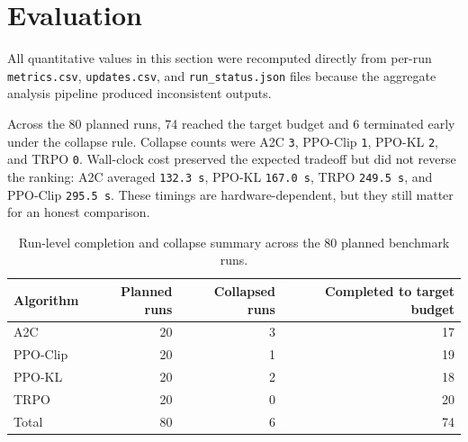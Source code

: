 \documentclass{article}
\begin{document}
\section{Evaluation}

All quantitative values in this section were recomputed directly from per-run \texttt{metrics.csv}, \texttt{updates.csv}, and \texttt{run\_status.json} files because the aggregate analysis pipeline produced inconsistent outputs.

\begin{table}[t]
  \caption{Mean final evaluation return by environment (mean $\pm$ sd across 5 seeds), with collapsed runs in parentheses. Final return means the last logged evaluation checkpoint for each run, and collapsed runs remain included at their last logged evaluation return.}
  \label{tab:main-results}
  \centering
  \scriptsize
\end{table}

Across the 80 planned runs, 74 reached the target budget and 6 terminated early under the collapse rule. Collapse counts were A2C \texttt{3}, PPO-Clip \texttt{1}, PPO-KL \texttt{2}, and TRPO \texttt{0}. Wall-clock cost preserved the expected tradeoff but did not reverse the ranking: A2C averaged \texttt{132.3 s}, PPO-KL \texttt{167.0 s}, TRPO \texttt{249.5 s}, and PPO-Clip \texttt{295.5 s}. These timings are hardware-dependent, but they still matter for an honest comparison.

\begin{table}[t]
  \caption{Run-level completion and collapse summary across the 80 planned benchmark runs.}
  \label{tab:collapse}
  \centering
  \small
  \begin{tabular}{lrrr}
    \toprule
    Algorithm & Planned runs & Collapsed runs & Completed to target budget \\
    \midrule
    A2C & 20 & 3 & 17 \\
    PPO-Clip & 20 & 1 & 19 \\
    PPO-KL & 20 & 2 & 18 \\
    TRPO & 20 & 0 & 20 \\
    \midrule
    Total & 80 & 6 & 74 \\
    \bottomrule
  \end{tabular}
\end{table}
\end{document}
